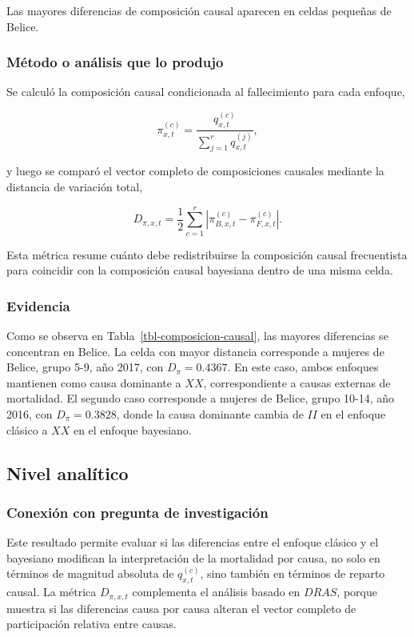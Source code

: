 \documentclass[
  spanish,
  letterpaper,
  DIV=11,
  numbers=noendperiod]{scrartcl}
\begin{document}
Las mayores diferencias de composición causal aparecen en celdas
pequeñas de Belice.

\subsubsection{Método o análisis que lo
produjo}\label{muxe9todo-o-anuxe1lisis-que-lo-produjo-1}

Se calculó la composición causal condicionada al fallecimiento para cada
enfoque,

\[
\pi_{x,t}^{(c)}
=
\frac{
q_{x,t}^{(c)}
}{
\sum_{j=1}^{r} q_{x,t}^{(j)}
},
\]

y luego se comparó el vector completo de composiciones causales mediante
la distancia de variación total,

\[
D_{\pi,x,t}
=
\frac{1}{2}
\sum_{c=1}^{r}
\left|
\pi_{B,x,t}^{(c)}
-
\pi_{F,x,t}^{(c)}
\right|.
\]

Esta métrica resume cuánto debe redistribuirse la composición causal
frecuentista para coincidir con la composición causal bayesiana dentro
de una misma celda.

\subsubsection{Evidencia}\label{evidencia-1}

Como se observa en Tabla~\ref{tbl-composicion-causal}, las mayores
diferencias se concentran en Belice. La celda con mayor distancia
corresponde a mujeres de Belice, grupo 5-9, año 2017, con
\(D_{\pi}=0.4367\). En este caso, ambos enfoques mantienen como causa
dominante a \(XX\), correspondiente a causas externas de mortalidad. El
segundo caso corresponde a mujeres de Belice, grupo 10-14, año 2016, con
\(D_{\pi}=0.3828\), donde la causa dominante cambia de \(II\) en el
enfoque clásico a \(XX\) en el enfoque bayesiano.

\subsection{Nivel analítico}\label{nivel-analuxedtico-1}

\subsubsection{Conexión con pregunta de
investigación}\label{conexiuxf3n-con-pregunta-de-investigaciuxf3n-1}

Este resultado permite evaluar si las diferencias entre el enfoque
clásico y el bayesiano modifican la interpretación de la mortalidad por
causa, no solo en términos de magnitud absoluta de \(q_{x,t}^{(c)}\),
sino también en términos de reparto causal. La métrica \(D_{\pi,x,t}\)
complementa el análisis basado en \(DRAS\), porque muestra si las
diferencias causa por causa alteran el vector completo de participación
relativa entre causas.
\end{document}
